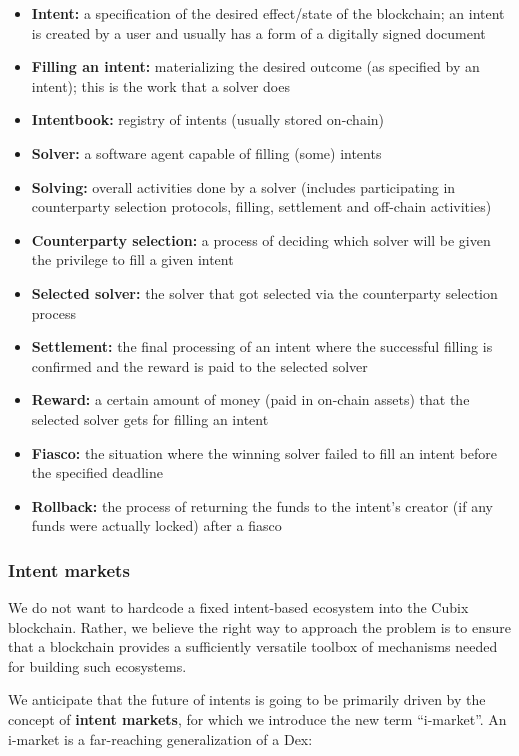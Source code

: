 \documentclass[a4paper]{article}
\begin{document}
\begin{itemize}
  \item \textbf{Intent:} a specification of the desired effect/state of the blockchain; an intent is created by a user and usually has a form of a digitally signed document
  \item \textbf{Filling an intent:} materializing the desired outcome (as specified by an intent); this is the work that a solver does
  \item \textbf{Intentbook:} registry of intents (usually stored on-chain)
  \item \textbf{Solver:} a software agent capable of filling (some) intents
  \item \textbf{Solving:} overall activities done by a solver (includes participating in counterparty selection protocols, filling, settlement and off-chain activities)
  \item \textbf{Counterparty selection:} a process of deciding which solver will be given the privilege to fill a given intent
  \item \textbf{Selected solver:} the solver that got selected via the counterparty selection process
  \item \textbf{Settlement:} the final processing of an intent where the successful filling is confirmed and the reward is paid to the selected solver
  \item \textbf{Reward:} a certain amount of money (paid in on-chain assets) that the selected solver gets for filling an intent
  \item \textbf{Fiasco:} the situation where the winning solver failed to fill an intent before the specified deadline
  \item \textbf{Rollback:} the process of returning the funds to the intent's creator (if any funds were actually locked) after a fiasco
\end{itemize}

\subsubsection{Intent markets}

We do not want to hardcode a fixed intent-based ecosystem into the Cubix blockchain. Rather, we believe the right way to approach the problem is to ensure that a blockchain provides a sufficiently versatile toolbox of mechanisms needed for building such ecosystems.

We anticipate that the future of intents is going to be primarily driven by the concept of \textbf{intent markets}, for which we introduce the new term ``i-market''. An i-market is a far-reaching generalization of a Dex:
\end{document}
